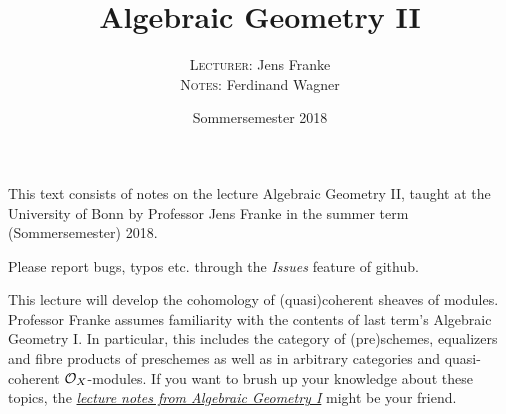 \documentclass[a4paper,parskip=half,numbers=enddot, DIV=12]{scrreprt}
\title{Algebraic Geometry II}
\author{\textsc{Lecturer:} Jens Franke\\
	\textsc{Notes:} Ferdinand Wagner}
\date{Sommersemester 2018}
\begin{document}
\maketitle
{}

\thispagestyle{plain}
This text consists of notes on the lecture Algebraic Geometry II, taught at the University of Bonn by Professor Jens Franke in the summer term (Sommersemester) 2018. 

Please report bugs, typos etc. through the \emph{Issues} feature of github.

\tableofcontents

This lecture will develop the cohomology of (quasi)coherent sheaves of modules. Professor Franke assumes familiarity with the contents of last term's Algebraic Geometry I. In particular, this includes the category of (pre)schemes, equalizers and fibre products of preschemes as well as in arbitrary categories and quasi-coherent $\mathcal{O}_X$-modules. If you want to brush up your knowledge about these topics, the \href{https://github.com/Nicholas42/AlgebraFranke/tree/master/AlgGeoI}{\emph{lecture notes from Algebraic Geometry I}} \cite{alggeo1} might be your friend.
\end{document}
